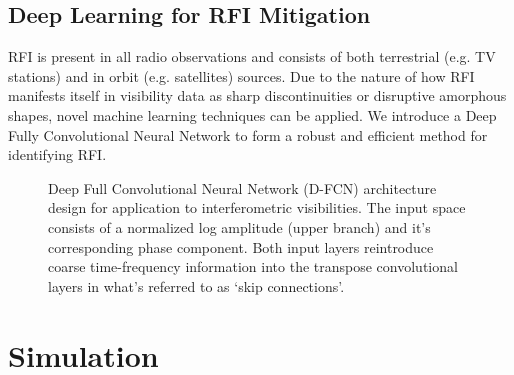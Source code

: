 \documentclass[a0,landscape]{a0poster}
\begin{document}
\begin{multicols}{4}
\subsection*{Deep Learning for RFI Mitigation}
RFI is present in all radio observations and consists of both terrestrial (e.g. TV stations) and in orbit (e.g. satellites) sources.
Due to the nature of how RFI manifests itself in visibility data as sharp discontinuities or disruptive amorphous shapes, novel machine learning techniques can be applied. We introduce a Deep Fully Convolutional Neural Network 
to form a robust and efficient method for identifying RFI.
\begin{figure}[H]
\centering
{}
\caption{Deep Full Convolutional Neural Network (D-FCN) architecture design for application to interferometric visibilities. The input space consists of a normalized log amplitude (upper branch) and it's corresponding phase component. Both input layers reintroduce coarse time-frequency information into the transpose convolutional layers in what's referred to as `skip connections'.}
\label{fig:DFCNArch}
\end{figure}



\columnbreak
\section*{Simulation}


\end{multicols}
\end{document}
